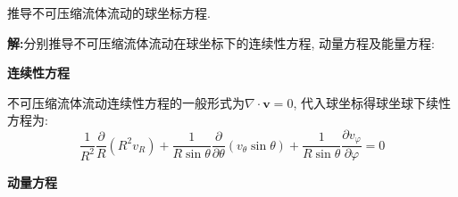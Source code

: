 \begin{problem}[问题3.3]
推导不可压缩流体流动的球坐标方程.
\end{problem}
\begin{solution}
\textbf{解:}分别推导不可压缩流体流动在球坐标下的连续性方程, 动量方程及能量方程:

\vspace{0.75em}
\noindent\textbf{连续性方程}
\vspace{0.75em}

\noindent 不可压缩流体流动连续性方程的一般形式为$\nabla\cdot\mathbf{v} = 0$, 代入球坐标得球坐球下续性方程为:
\[
\frac{1}{R^2}\frac{\partial}{R}(R^2v_R) + \frac{1}{R\sin\theta}\frac{\partial}{\partial\theta}(v_\theta\sin\theta) + \frac{1}{R\sin\theta}\frac{\partial v_\varphi}{\partial\varphi} = 0
\]

\vspace{0.75em}
\noindent\textbf{动量方程}
\vspace{0.75em}


\end{solution}
